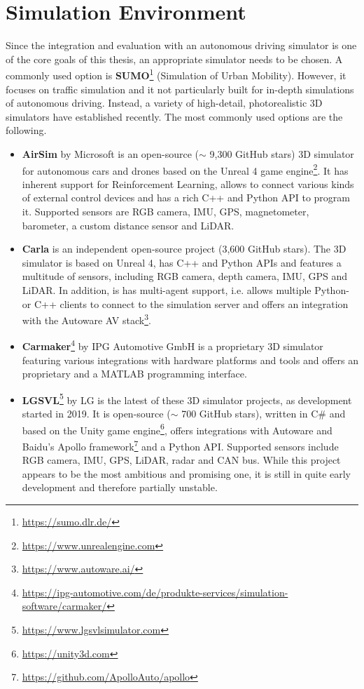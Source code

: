 \section{Simulation Environment}
\label{sec:implementation:simulation_environment}
Since the integration and evaluation with an autonomous driving simulator is one of the core goals of this thesis, an appropriate simulator needs to be chosen. A commonly used option is \textbf{SUMO}\footnote{\url{https://sumo.dlr.de/}} (Simulation of Urban Mobility). However, it focuses on traffic simulation and it not particularly built for in-depth simulations of autonomous driving. Instead, a variety of high-detail, photorealistic 3D simulators have established recently. The most commonly used options are the following.

\begin{itemize}
	\item \textbf{AirSim} by Microsoft \cite{airsim2017fsr} is an open-source ($\sim$ 9,300 GitHub stars) 3D simulator for autonomous cars and drones based on the Unreal 4 game engine\footnote{\url{https://www.unrealengine.com}}. It has inherent support for Reinforcement Learning, allows to connect various kinds of external control devices and has a rich C++ and Python API to program it. Supported sensors are RGB camera, IMU, GPS, magnetometer, barometer, a custom distance sensor and LiDAR. 
	\item \textbf{Carla} \cite{Dosovitskiy17} is an independent open-source project (3,600 GitHub stars). The 3D simulator is based on Unreal 4, has C++ and Python APIs and features a multitude of sensors, including RGB camera, depth camera, IMU, GPS and LiDAR. In addition, is has multi-agent support, i.e. allows multiple Python- or C++ clients to connect to the simulation server and offers an integration with the Autoware AV stack\footnote{\url{https://www.autoware.ai/}}.
	\item \textbf{Carmaker}\footnote{\url{https://ipg-automotive.com/de/produkte-services/simulation-software/carmaker/}} by IPG Automotive GmbH is a proprietary 3D simulator featuring various integrations with hardware platforms and tools and offers an proprietary and a MATLAB programming interface.
	\item \textbf{LGSVL}\footnote{\url{https://www.lgsvlsimulator.com}} by LG is the latest of these 3D simulator projects, as development started in 2019. It is open-source ($\sim$ 700 GitHub stars), written in C\# and based on the Unity game engine\footnote{\url{https://unity3d.com}}, offers integrations with Autoware and Baidu's Apollo framework\footnote{\url{https://github.com/ApolloAuto/apollo}} and a Python API. Supported sensors include RGB camera, IMU, GPS, LiDAR, radar and CAN bus. While this project appears to be the most ambitious and promising one, it is still in quite early development and therefore partially unstable.
\end{itemize}

